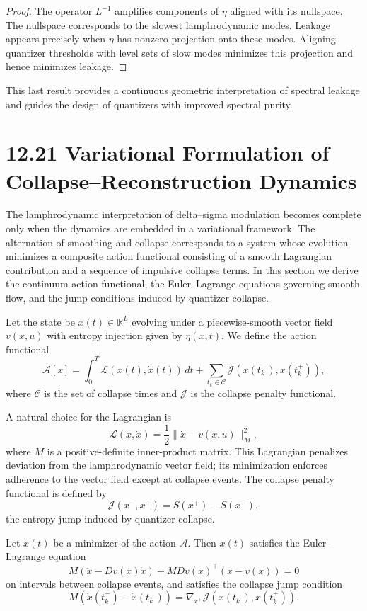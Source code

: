 \begin{proof}
The operator $L^{-1}$ amplifies components of $\eta$ aligned with its nullspace. The nullspace corresponds to the slowest lamphrodynamic modes. Leakage appears precisely when $\eta$ has nonzero projection onto these modes. Aligning quantizer thresholds with level sets of slow modes minimizes this projection and hence minimizes leakage.
\end{proof}

This last result provides a continuous geometric interpretation of spectral leakage and guides the design of quantizers with improved spectral purity.

\section*{12.21 Variational Formulation of Collapse--Reconstruction Dynamics}

The lamphrodynamic interpretation of delta--sigma modulation becomes complete only when the dynamics are embedded in a variational framework. The alternation of smoothing and collapse corresponds to a system whose evolution minimizes a composite action functional consisting of a smooth Lagrangian contribution and a sequence of impulsive collapse terms. In this section we derive the continuum action functional, the Euler--Lagrange equations governing smooth flow, and the jump conditions induced by quantizer collapse.

Let the state be $x(t) \in \mathbb{R}^{L}$ evolving under a piecewise-smooth vector field $v(x,u)$ with entropy injection given by $\eta(x,t)$. We define the action functional
\[
\mathcal{A}[x] = \int_{0}^{T} \mathcal{L}(x(t),\dot{x}(t)) \, dt + \sum_{t_k \in \mathcal{C}} \mathcal{J}(x(t_k^-),x(t_k^+)),
\]
where $\mathcal{C}$ is the set of collapse times and $\mathcal{J}$ is the collapse penalty functional.

A natural choice for the Lagrangian is
\[
\mathcal{L}(x,\dot{x}) = \frac{1}{2} \|\dot{x} - v(x,u)\|_{M}^{2},
\]
where $M$ is a positive-definite inner-product matrix. This Lagrangian penalizes deviation from the lamphrodynamic vector field; its minimization enforces adherence to the vector field except at collapse events. The collapse penalty functional is defined by
\[
\mathcal{J}(x^{-},x^{+}) = S(x^{+}) - S(x^{-}),
\]
the entropy jump induced by quantizer collapse.

\begin{theorem}
Let $x(t)$ be a minimizer of the action $\mathcal{A}$. Then $x(t)$ satisfies the Euler--Lagrange equation
\[
M (\ddot{x} - Dv(x)\dot{x}) + M Dv(x)^{\top}( \dot{x} - v(x)) = 0
\]
on intervals between collapse events, and satisfies the collapse jump condition
\[
M (\dot{x}(t_k^+) - \dot{x}(t_k^-))
= \nabla_{x^{+}} \mathcal{J}(x(t_k^-),x(t_k^+)).
\]
\end{theorem}

